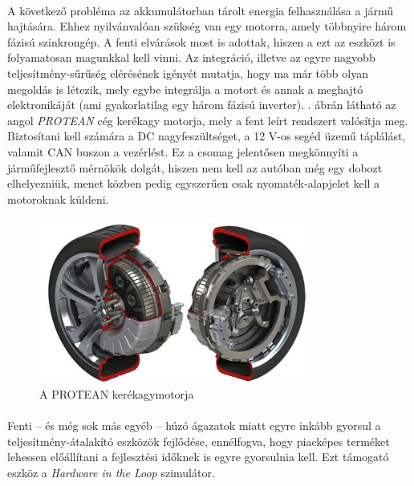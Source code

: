 \paragraph{}
A következő probléma az akkumulátorban tárolt energia felhasználása a jármű hajtására. Ehhez nyilvánvalóan szükség van egy motorra, amely többnyire három fázisú szinkrongép. A fenti elvárások most is adottak, hiszen a ezt az eszközt is folyamatosan magunkkal kell vinni. Az integráció, illetve az egyre nagyobb teljesítmény-sűrűség elérésének igényét mutatja, hogy ma már több olyan megoldás is létezik, mely egybe integrálja a motort és annak a meghajtó elektronikáját (ami gyakorlatilag egy három fázisú inverter). . ábrán látható az angol \emph{PROTEAN} cég kerékagy motorja, mely a fent leírt rendszert valósítja meg. Biztosítani kell számára a DC nagyfeszültséget, a 12 V-os segéd üzemű táplálást, valamit CAN buszon a vezérlést. Ez a csomag jelentősen megkönnyíti a járműfejlesztő mérnökök dolgát, hiszen nem kell az autóban még egy dobozt elhelyezniük, menet közben pedig egyszerűen csak nyomaték-alapjelet kell a motoroknak küldeni.

\begin{figure}[h]
	\centering
	\includegraphics[width = 0.8\textwidth]{figures/protean_motor.jpg}
	\caption{A PROTEAN kerékagymotorja} 
	\label{fig:protean}
\end{figure}

\paragraph{}
Fenti -- és még sok más egyéb -- húzó ágazatok miatt egyre inkább gyorsul a teljesítmény-átalakító eszközök fejlődése, ennélfogva, hogy piacképes terméket lehessen előállítani a fejlesztési időknek is egyre gyorsulnia kell. Ezt támogató eszköz a \emph{Hardware in the Loop} szimulátor. 


